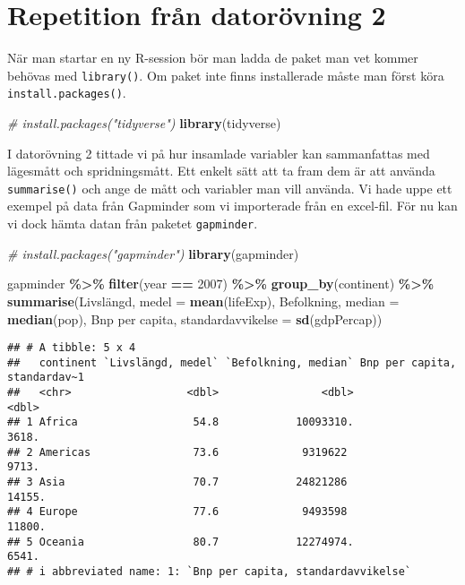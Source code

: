 \documentclass[
]{book}
\newenvironment{Shaded}{\begin{snugshade}}{\end{snugshade}}
\newcommand{\AttributeTok}[1]{\textcolor[rgb]{0.13,0.29,0.53}{#1}}
\newcommand{\CommentTok}[1]{\textcolor[rgb]{0.56,0.35,0.01}{\textit{#1}}}
\newcommand{\DecValTok}[1]{\textcolor[rgb]{0.00,0.00,0.81}{#1}}
\newcommand{\FunctionTok}[1]{\textcolor[rgb]{0.13,0.29,0.53}{\textbf{#1}}}
\newcommand{\NormalTok}[1]{#1}
\newcommand{\OtherTok}[1]{\textcolor[rgb]{0.56,0.35,0.01}{#1}}
\newcommand{\SpecialCharTok}[1]{\textcolor[rgb]{0.81,0.36,0.00}{\textbf{#1}}}
\newcommand{\StringTok}[1]{\textcolor[rgb]{0.31,0.60,0.02}{#1}}
\theoremstyle{definition}
\theoremstyle{definition}
\theoremstyle{definition}
\theoremstyle{definition}
\theoremstyle{remark}
\begin{document}
\hypertarget{repetition-fruxe5n-datoruxf6vning-2}{%
\section{Repetition från datorövning 2}\label{repetition-fruxe5n-datoruxf6vning-2}}

När man startar en ny R-session bör man ladda de paket man vet kommer behövas med \texttt{library()}. Om paket inte finns installerade måste man först köra \texttt{install.packages()}.

\begin{Shaded}
\begin{Highlighting}[]
\CommentTok{\# install.packages("tidyverse")}
\FunctionTok{library}\NormalTok{(tidyverse)}
\end{Highlighting}
\end{Shaded}

I datorövning 2 tittade vi på hur insamlade variabler kan sammanfattas med lägesmått och spridningsmått. Ett enkelt sätt att ta fram dem är att använda \texttt{summarise()} och ange de mått och variabler man vill använda. Vi hade uppe ett exempel på data från Gapminder som vi importerade från en excel-fil. För nu kan vi dock hämta datan från paketet \texttt{gapminder}.

\begin{Shaded}
\begin{Highlighting}[]
\CommentTok{\# install.packages("gapminder")}
\FunctionTok{library}\NormalTok{(gapminder)}

\NormalTok{gapminder }\SpecialCharTok{\%\textgreater{}\%} 
  \FunctionTok{filter}\NormalTok{(year }\SpecialCharTok{==} \DecValTok{2007}\NormalTok{) }\SpecialCharTok{\%\textgreater{}\%} 
  \FunctionTok{group\_by}\NormalTok{(continent) }\SpecialCharTok{\%\textgreater{}\%} 
  \FunctionTok{summarise}\NormalTok{(}\StringTok{\textasciigrave{}}\AttributeTok{Livslängd, medel}\StringTok{\textasciigrave{}} \OtherTok{=} \FunctionTok{mean}\NormalTok{(lifeExp),}
            \StringTok{\textasciigrave{}}\AttributeTok{Befolkning, median}\StringTok{\textasciigrave{}} \OtherTok{=} \FunctionTok{median}\NormalTok{(pop),}
            \StringTok{\textasciigrave{}}\AttributeTok{Bnp per capita, standardavvikelse}\StringTok{\textasciigrave{}} \OtherTok{=} \FunctionTok{sd}\NormalTok{(gdpPercap))}
\end{Highlighting}
\end{Shaded}

\begin{verbatim}
## # A tibble: 5 x 4
##   continent `Livslängd, medel` `Befolkning, median` Bnp per capita, standardav~1
##   <chr>                  <dbl>                <dbl>                        <dbl>
## 1 Africa                  54.8            10093310.                        3618.
## 2 Americas                73.6             9319622                         9713.
## 3 Asia                    70.7            24821286                        14155.
## 4 Europe                  77.6             9493598                        11800.
## 5 Oceania                 80.7            12274974.                        6541.
## # i abbreviated name: 1: `Bnp per capita, standardavvikelse`
\end{verbatim}
\end{document}
